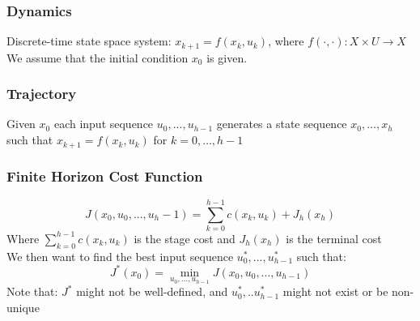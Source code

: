 \documentclass{article}
\begin{document}
\subsubsection*{Dynamics}
Discrete-time state space system: $x_{k+1} = f(x_k,u_k)$, where $f(\cdot, \cdot) : X \times U \rightarrow X$ \\ We assume that the initial condition $x_0$ is given.
\subsubsection*{Trajectory}
Given $x_0$ each input sequence $u_0,...,u_{h-1}$ generates a state sequence $x_0,...,x_h$ such that $x_{k+1} = f(x_k,u_k)$ for $k=0,\hdots, h-1$
\subsubsection*{Finite Horizon Cost Function}
\[
J(x_0, u_0,...,u_h-1) = \sum_{k=0}^{h-1} c(x_k,u_k) + J_h(x_h)
\]
Where $\sum_{k=0}^{h-1} c(x_k,u_k)$ is the stage cost and $J_h(x_h)$ is the terminal cost \\
We then want to find the best input sequence $u_0^*,...,u_{h-1}^*$ such that: 
\[
J^*(x_0) = \min_{u_0,...,u_{h-1}} J(x_0,u_0,...,u_{h-1})
\]
Note that: $J^*$ might not be well-defined, and $u_0^*,..u_{h-1}^*$ might not exist or be non-unique
\end{document}
